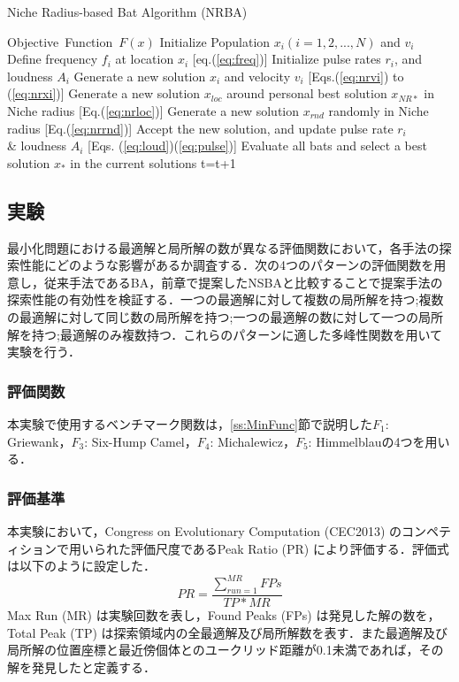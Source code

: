 \documentclass[a4j,11pt]{jarticle}
\begin{document}
\begin{algorithm}[H]
\caption{Niche Radius-based Bat Algorithm (NRBA)}
\label{code:nrba}
\begin{algorithmic}[2]
\REQUIRE Objective\ Function\ $F(x)$
\STATE Initialize Population $x_i(i=1,2,..., N)$ and $v_i$\\
\STATE Define frequency $f_i$ at location $x_i$ [eq.(\ref{eq:freq})]
\STATE Initialize pulse rates $r_i$, and loudness $A_i$
\STATE Generate a new solution $x_i$ and velocity $v_i$ [Eqs.(\ref{eq:nrvi}) to (\ref{eq:nrxi})]
\ENDIF
{}
\STATE Generate a new solution $x_{loc}$ around personal best solution $x_{NR*}$ in Niche radius [Eq.(\ref{eq:nrloc})] 
\ENDIF
\STATE Generate a new solution $x_{rnd}$ randomly in Niche radius [Eq.(\ref{eq:nrrnd})]
\STATE Accept the new solution, and update pulse rate $r_i$ \\ \& loudness $A_i$ [Eqs. (\ref{eq:loud})(\ref{eq:pulse})]  
\ENDIF
\STATE Evaluate all bats and select a best solution $x_*$ in the current solutions
\ENDFOR
\STATE t=t+1
\ENDWHILE
\end{algorithmic}
\end{algorithm}

\subsection{実験}
\label{ss:NRBA-exp}
最小化問題における最適解と局所解の数が異なる評価関数において，各手法の探索性能にどのような影響があるか調査する．次の4つのパターンの評価関数を用意し，従来手法であるBA，前章で提案したNSBAと比較することで提案手法の探索性能の有効性を検証する．一つの最適解に対して複数の局所解を持つ;複数の最適解に対して同じ数の局所解を持つ;一つの最適解の数に対して一つの局所解を持つ;最適解のみ複数持つ．これらのパターンに適した多峰性関数を用いて実験を行う．

\subsubsection{評価関数}
\label{sss:NRBA-func}
本実験で使用するベンチマーク関数は，\ref{ss:MinFunc}節で説明した$F_1$: Griewank，$F_3$: Six-Hump Camel，$F_4$: Michalewicz，$F_5$: Himmelblauの4つを用いる．

\subsubsection{評価基準}
\label{sss:NRBA-eval}
本実験において，Congress on Evolutionary Computation (CEC2013) \cite{CEC2013} のコンペティションで用いられた評価尺度であるPeak Ratio (PR) \cite{CDE} により評価する．評価式は以下のように設定した．
\begin{equation}
\label{eq:PR}
PR=\frac{\sum_{run=1}^{MR}FPs}{TP*MR}
\end{equation}
Max Run (MR) は実験回数を表し，Found Peaks (FPs) は発見した解の数を，Total Peak (TP) は探索領域内の全最適解及び局所解数を表す．また最適解及び局所解の位置座標と最近傍個体とのユークリッド距離が0.1未満であれば，その解を発見したと定義する．
\end{document}
